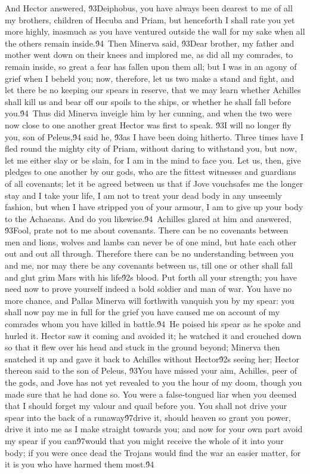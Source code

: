 {And Hector answered, \'93Deiphobus, you have always been dearest to me of all my brothers, children of Hecuba and Priam, but henceforth I shall rate you yet more highly, inasmuch as you have ventured outside the wall for my sake when all the others remain inside.\'94\
Then Minerva said, \'93Dear brother, my father and mother went down on their knees and implored me, as did all my comrades, to remain inside, so great a fear has fallen upon them all; but I was in an agony of grief when I beheld you; now, therefore, let us two make a stand and fight, and let there be no keeping our spears in reserve, that we may learn whether Achilles shall kill us and bear off our spoils to the ships, or whether he shall fall before you.\'94\
Thus did Minerva inveigle him by her cunning, and when the two were now close to one another great Hector was first to speak. \'93I will no longer fly you, son of Peleus,\'94 said he, \'93as I have been doing hitherto. Three times have I fled round the mighty city of Priam, without daring to withstand you, but now, let me either slay or be slain, for I am in the mind to face you. Let us, then, give pledges to one another by our gods, who are the fittest witnesses and guardians of all covenants; let it be agreed between us that if Jove vouchsafes me the longer stay and I take your life, I am not to treat your dead body in any unseemly fashion, but when I have stripped you of your armour, I am to give up your body to the Achaeans. And do you likewise.\'94\
Achilles glared at him and answered, \'93Fool, prate not to me about covenants. There can be no covenants between men and lions, wolves and lambs can never be of one mind, but hate each other out and out all through. Therefore there can be no understanding between you and me, nor may there be any covenants between us, till one or other shall fall and glut grim Mars with his life\'92s blood. Put forth all your strength; you have need now to prove yourself indeed a bold soldier and man of war. You have no more chance, and Pallas Minerva will forthwith vanquish you by my spear: you shall now pay me in full for the grief you have caused me on account of my comrades whom you have killed in battle.\'94\
He poised his spear as he spoke and hurled it. Hector saw it coming and avoided it; he watched it and crouched down so that it flew over his head and stuck in the ground beyond; Minerva then snatched it up and gave it back to Achilles without Hector\'92s seeing her; Hector thereon said to the son of Peleus, \'93You have missed your aim, Achilles, peer of the gods, and Jove has not yet revealed to you the hour of my doom, though you made sure that he had done so. You were a false-tongued liar when you deemed that I should forget my valour and quail before you. You shall not drive your spear into the back of a runaway\'97drive it, should heaven so grant you power, drive it into me as I make straight towards you; and now for your own part avoid my spear if you can\'97would that you might receive the whole of it into your body; if you were once dead the Trojans would find the war an easier matter, for it is you who have harmed them most.\'94\
}
